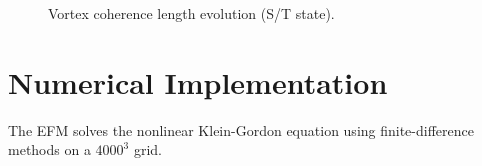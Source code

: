 \documentclass[11pt]{article}
\begin{document}
\begin{figure}[ht]
    \centering
    \caption{Vortex coherence length evolution (S/T state).}
    \label{fig:vortex_stab}
\end{figure}

\section{Numerical Implementation}
The EFM solves the nonlinear Klein-Gordon equation using finite-difference methods on a \(4000^3\) grid.
\end{document}
